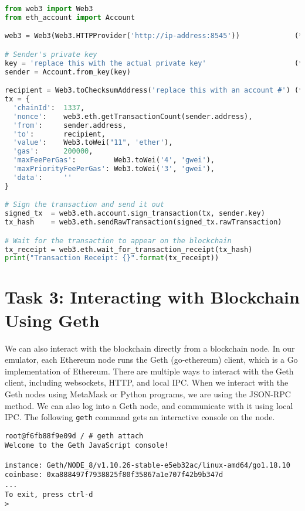 \begin{lstlisting}[caption=Send transaction (\texttt{web3\_raw\_tx.py}), language=python]
from web3 import Web3
from eth_account import Account

web3 = Web3(Web3.HTTPProvider('http://ip-address:8545'))             (*@\lineone@*) 

# Sender's private key
key = 'replace this with the actual private key'                     (*@\linetwo@*) 
sender = Account.from_key(key)

recipient = Web3.toChecksumAddress('replace this with an account #') (*@\linethree@*) 
tx = {
  'chainId':  1337,
  'nonce':    web3.eth.getTransactionCount(sender.address),
  'from':     sender.address,
  'to':       recipient,
  'value':    Web3.toWei("11", 'ether'),
  'gas':      200000,
  'maxFeePerGas':         Web3.toWei('4', 'gwei'),
  'maxPriorityFeePerGas': Web3.toWei('3', 'gwei'),
  'data':     ''
}

# Sign the transaction and send it out
signed_tx  = web3.eth.account.sign_transaction(tx, sender.key)
tx_hash    = web3.eth.sendRawTransaction(signed_tx.rawTransaction)

# Wait for the transaction to appear on the blockchain
tx_receipt = web3.eth.wait_for_transaction_receipt(tx_hash)
print("Transaction Receipt: {}".format(tx_receipt))
\end{lstlisting}


\section{Task 3: Interacting with Blockchain Using Geth} 

We can also interact with the blockchain directly from 
a blockchain node. 
In our emulator, each Ethereum node runs the Geth (go-ethereum) client, which is 
a Go implementation of Ethereum. 
There are multiple ways to interact with the Geth client, including websockets,
HTTP, and local IPC. When we interact with the Geth nodes 
using MetaMask or Python programs, we are using the JSON-RPC method. 
We can also log into a Geth node, and communicate with
it using local IPC. The following \texttt{geth} command
gets an interactive console on the node. 


\begin{lstlisting}
root@f6fb88f9e09d / # geth attach
Welcome to the Geth JavaScript console!

instance: Geth/NODE_8/v1.10.26-stable-e5eb32ac/linux-amd64/go1.18.10
coinbase: 0xa888497f7938825f80f35867a1e707f42b9b347d
...
To exit, press ctrl-d
>
\end{lstlisting}

